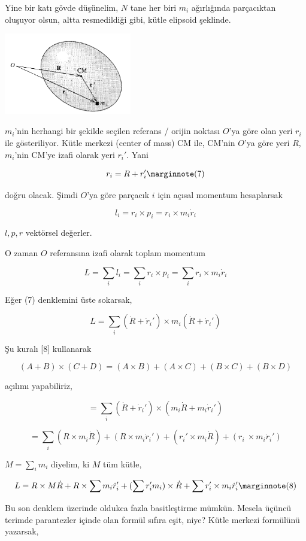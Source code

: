 \documentclass[12pt,fleqn]{article}\usepackage{../../common}
\begin{document}
Yine bir katı gövde düşünelim, $N$ tane her biri $m_i$ ağırlığında parçacıktan
oluşuyor olsun, altta resmedildiği gibi, kütle elipsoid şeklinde.

\includegraphics[width=15em]{phy_005_basics_09.png}

$m_i$'nin herhangi bir şekilde seçilen referans / orijin noktası $O$'ya göre
olan yeri $r_i$ ile gösteriliyor. Kütle merkezi (center of mass) CM ile,
CM'nin $O$'ya göre yeri $R$, $m_i$'nin CM'ye izafi olarak yeri $r_i'$. Yani

$$
r_i = R + r_i'
\mlabel{7}
$$

doğru olacak. Şimdi $O$'ya göre parçacık $i$ için açısal momentum hesaplarsak

$$
l_i = r_i \times p_i = r_i \times m_i \dot{r}_i
$$

$l,p,r$ vektörsel değerler.

O zaman $O$ referansına izafi olarak toplam momentum

$$
L = \sum_i l_i = \sum_i r_i \times p_i = \sum_i r_i \times m_i \dot{r}_i
$$

Eğer (7) denklemini üste sokarsak,

$$
L = \sum_i (\dot{R} + \dot{r}_i') \times m_i (\dot{R} + \dot{r}_i' )
$$

Şu kuralı [8] kullanarak

$$
(A + B) \times (C+D) = (A \times B) + (A \times C) + (B \times C) + (B \times D) 
$$

açılımı yapabiliriz, 

$$
 = \sum_i (\dot{R} + \dot{r}_i') \times (m_i \dot{R} + m_i \dot{r}_i' )
$$


$$
= \sum_i (R \times m_i \dot{R}) +
  (R \times m_i \dot{r}_i') +
  (r_i' \times m_i \dot{R}) +
  (r_i\ \times m_i \dot{r}_i')   
$$

$M = \sum_i m_i $ diyelim, ki $M$ tüm kütle,

$$
L = R \times M\dot{R} +
R \times \sum m_i \dot{r}_i' +
(\sum r_i' m_i) \times \dot{R} +
\sum r_i' \times m_i \dot{r}_i'
\mlabel{8}
$$

Bu son denklem üzerinde oldukca fazla basitleştirme mümkün. Mesela üçüncü
terimde parantezler içinde olan formül sıfıra eşit, niye? Kütle merkezi
formülünü yazarsak,
\end{document}
